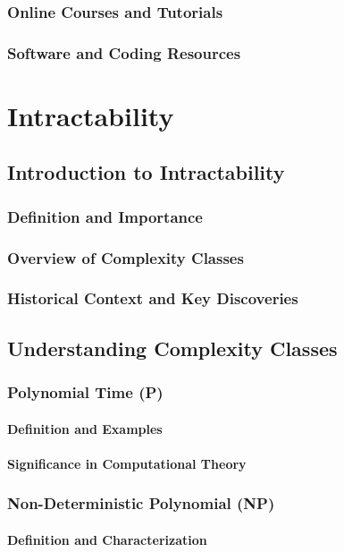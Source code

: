 \documentclass[12pt]{book} %
\begin{document}
\subsection{Online Courses and Tutorials}
\subsection{Software and Coding Resources}

\chapter{Intractability}

\section{Introduction to Intractability}
\subsection{Definition and Importance}
\subsection{Overview of Complexity Classes}
\subsection{Historical Context and Key Discoveries}

\section{Understanding Complexity Classes}
\subsection{Polynomial Time (P)}
\subsubsection{Definition and Examples}
\subsubsection{Significance in Computational Theory}
\subsection{Non-Deterministic Polynomial (NP)}
\subsubsection{Definition and Characterization}
\end{document}
